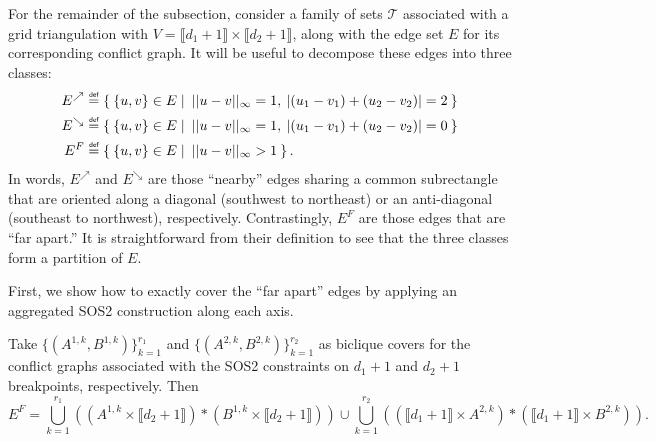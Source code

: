 \documentclass[opre,nonblindrev]{informs3} %
\newcommand{\blue}[1]{{#1}}
\newcommand{\calT}{\mathcal{T}}
\newcommand\defeq{\mathrel{\overset{\makebox[0pt]{\mbox{\normalfont\tiny\sffamily def}}}{=}}}
\begin{document}
\blue{

For the remainder of the subsection, consider a family of sets $\calT$ associated with a grid triangulation with $V = 
\llbracket d_1 + 1 \rrbracket \times \llbracket d_2 + 1 \rrbracket$, along with the edge set $E$ for its corresponding conflict graph. It will be useful to decompose these edges into three classes:
\begin{align*}
    E^\nearrow &\defeq \Set{ \{u,v\} \in E | \: ||u-v||_\infty = 1, \: |(u_1-v_1) + (u_2-v_2)| = 2 } \\
    E^\searrow &\defeq \Set{ \{u,v\} \in E | \: ||u-v||_\infty = 1, \: |(u_1-v_1) + (u_2-v_2)| = 0 } \\
    E^F &\defeq \Set{\{u,v\} \in E |\: ||u-v||_\infty > 1}.
\end{align*}
In words, $E^\nearrow$ and $E^\searrow$ are those ``nearby'' edges sharing a common subrectangle that are oriented along a diagonal (southwest to northeast) or an anti-diagonal (southeast to northwest), respectively. Contrastingly, $E^F$ are those edges that are ``far apart.'' It is straightforward from their definition to see that the three classes form a partition of $E$.

First, we show how to exactly cover the ``far apart'' edges by applying an aggregated SOS2 construction along each axis.

\begin{lemma} \label{lemma:aggregated-sos2}
    Take $\{(A^{1,k},B^{1,k})\}_{k=1}^{r_1}$ and $\{(A^{2,k},B^{2,k})\}_{k=1}^{r_2}$ as biclique covers for the conflict graphs associated with the SOS2 constraints on $d_1+1$ and $d_2+1$ breakpoints, respectively. Then
    \begin{equation} \label{eqn:far-away-edges}
        E^F = \bigcup_{k=1}^{r_1} \left((A^{1,k} \times \llbracket d_2 + 1 \rrbracket) * (B^{1,k} \times \llbracket d_2 + 1 \rrbracket)\right) \cup \bigcup_{k=1}^{r_2} \left((\llbracket d_1 + 1 \rrbracket \times A^{2,k}) * (\llbracket d_1 + 1 \rrbracket \times B^{2,k})\right).
    \end{equation}
\end{lemma}

}
\end{document}
